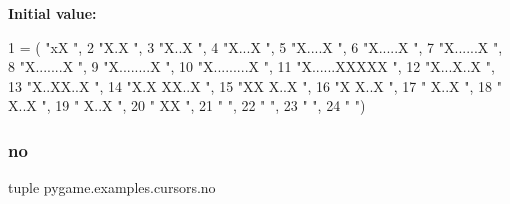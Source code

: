 {\bfseries Initial value\+:}
\begin{DoxyCode}
1 =  ( \textcolor{stringliteral}{"xX                      "},
2           \textcolor{stringliteral}{"X.X                     "},
3           \textcolor{stringliteral}{"X..X                    "},
4           \textcolor{stringliteral}{"X...X                   "},
5           \textcolor{stringliteral}{"X....X                  "},
6           \textcolor{stringliteral}{"X.....X                 "},
7           \textcolor{stringliteral}{"X......X                "},
8           \textcolor{stringliteral}{"X.......X               "},
9           \textcolor{stringliteral}{"X........X              "},
10           \textcolor{stringliteral}{"X.........X             "},
11           \textcolor{stringliteral}{"X......XXXXX            "},
12           \textcolor{stringliteral}{"X...X..X                "},
13           \textcolor{stringliteral}{"X..XX..X                "},
14           \textcolor{stringliteral}{"X.X XX..X               "},
15           \textcolor{stringliteral}{"XX   X..X               "},
16           \textcolor{stringliteral}{"X     X..X              "},
17           \textcolor{stringliteral}{"      X..X              "},
18           \textcolor{stringliteral}{"       X..X             "},
19           \textcolor{stringliteral}{"       X..X             "},
20           \textcolor{stringliteral}{"        XX              "},
21           \textcolor{stringliteral}{"                        "},
22           \textcolor{stringliteral}{"                        "},
23           \textcolor{stringliteral}{"                        "},
24           \textcolor{stringliteral}{"                        "})
\end{DoxyCode}
\mbox{\label{namespacepygame_1_1examples_1_1cursors_a68ec3367d4e4c59119c700e29444b9cc}} 
\subsubsection{\texorpdfstring{no}{no}}
{\footnotesize\ttfamily tuple pygame.\+examples.\+cursors.\+no}

